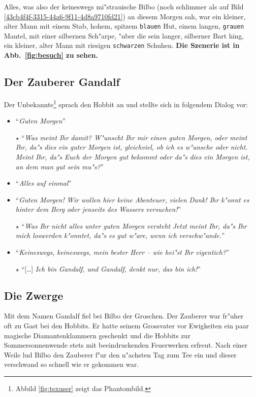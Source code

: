 \documentclass[a4paper]{article}
\begin{document}
Alles, was also der keineswegs mi"strauische Bilbo (noch schlimmer als auf Bild \ref{43cb4f4f-3315-44a6-9f11-4d8a9710fd21}) an diesem Morgen sah, war 
ein kleiner, alter Mann mit einem Stab, hohem, spitzem \texttt{blauen} Hut, 
einem langen, \texttt{grauen} Mantel, mit einer silbernen Sch"arpe, "uber die 
sein langer, silberner Bart hing, ein kleiner, alter Mann mit riesigen 
\texttt{schwarzen} Schuhen. \textbf{Die Szenerie ist in 
Abb.~\ref{fig:besuch} zu sehen.}
\subsection{Der Zauberer Gandalf}
%
Der Unbekannte\footnote{Abbild \ref{fig:texuser} zeigt das Phantombild.}
sprach den Hobbit an und stellte sich in folgendem Dialog
vor:
\begin{itemize}
\item 
"`\textit{Guten Morgen}"'

\item[$\star$]
"`\textit{Was meint Ihr damit? W"unscht Ihr mir einen guten 
Morgen, oder meint Ihr, da"s dies ein \emph{guter Morgen} ist, gleichviel, ob 
ich es w"unsche oder nicht. Meint Ihr, da"s Euch der Morgen gut bekommt oder 
da"s dies ein Morgen ist, an dem man gut sein mu"s?}"'

\item
"`\textit{Alles auf einmal}"'

\item
"`\textit{Guten Morgen! Wir wollen hier 
keine Abenteuer, vielen Dank! Ihr k"onnt es hinter dem Berg oder jenseits des 
Wassers versuchen!}"'

\item[$\star$]
"`\textit{Was Ihr nicht alles unter guten Morgen versteht Jetzt meint Ihr, 
da"s Ihr mich loswerden k"onntet, da"s es gut w"are, wenn ich verschw"ande.}"' 

\item
"`\textit{Keineswegs, keineswegs, mein bester Herr -- wie hei"st Ihr eigentich?}"'

\item[$\star$]
"`[\dots] \textit{Ich bin Gandalf, und Gandalf, denkt nur, das bin ich!}"'
\end{itemize}
\subsection{Die Zwerge}
%
Mit dem Namen Gandalf fiel bei Bilbo der Groschen. Der Zauberer war fr"uher
oft zu Gast bei den Hobbits. Er hatte
seinem Grossvater vor Ewigkeiten ein paar magische Diamantenklammern 
geschenkt und die Hobbits zur Sommersonnenwende stets mit beeindruckenden
Feuerwerken erfreut. Nach einer Weile lud Bilbo den Zauberer f"ur den
n"achsten Tag zum Tee ein und dieser verschwand so schnell wie er
gekommen war.
 
\end{document}

